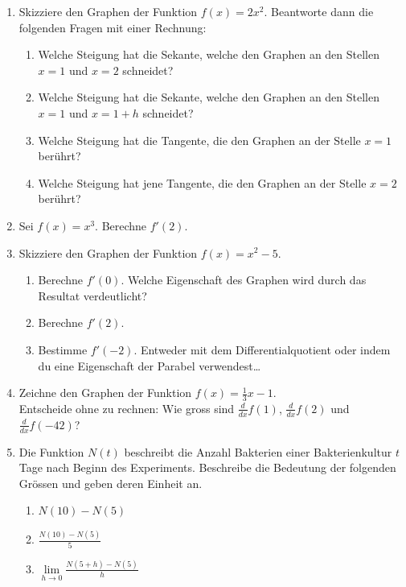 \begin{ueb}
    {}{}
    \begin{enumerate}
        \item Skizziere den Graphen der Funktion \( f(x) = 2x^2 \). Beantworte dann die folgenden Fragen mit einer Rechnung:
        \begin{enumerate}
          \item  Welche Steigung hat die Sekante, welche den Graphen an den Stellen \( x = 1 \) und \( x = 2 \) schneidet?
          \item Welche Steigung hat die Sekante, welche den Graphen an den Stellen \( x = 1 \) und \( x = 1 + h \) schneidet?
          \item Welche Steigung hat die Tangente, die den Graphen an der Stelle \( x = 1 \) berührt?
          \item Welche Steigung hat jene Tangente, die den Graphen an der Stelle \( x = 2 \) berührt?
        \end{enumerate}
      
        \item Sei \( f(x) = x^3 \).
       Berechne \( f'(2) \).
      
        \item Skizziere den Graphen der Funktion \( f(x) = x^2 - 5 \).
        \begin{enumerate}
          \item Berechne \( f'(0) \). Welche Eigenschaft des Graphen wird durch das Resultat verdeutlicht?
          \item Berechne \( f'(2) \). 
          \item Bestimme \( f'(-2) \). Entweder mit dem Differentialquotient oder indem du eine Eigenschaft der Parabel verwendest\dots
        \end{enumerate}
      
        \item Zeichne den Graphen der Funktion \( f(x) = \frac{1}{3}x - 1 \).\\
              Entscheide ohne zu rechnen: Wie gross sind \( \frac{d}{dx} f(1) \), \( \frac{d}{dx} f(2) \) und \( \frac{d}{dx} f(-42) \)?
        
        \item Die Funktion $N(t)$ beschreibt die Anzahl Bakterien einer Bakterienkultur $t$ Tage nach Beginn des Experiments. Beschreibe die Bedeutung der folgenden Grössen und geben deren Einheit an.
        \begin{enumerate}
            \item $N(10)-N(5)$
            \item $\frac{N(10)-N(5)}{5}$
            \item $\lim\limits_{h\to0}\frac{N(5+h)-N(5)}{h}$
        \end{enumerate}


\end{enumerate}
\end{ueb}
